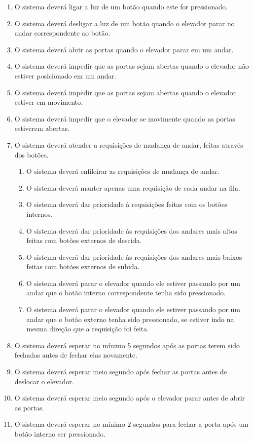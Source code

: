 \begin{enumerate}[label=RF \arabic*. , ref=\arabic*]
	\item O sistema deverá ligar a luz de um botão quando este for pressionado.
  \item O sistema deverá desligar a luz de um botão quando o elevador parar no andar correspondente ao botão.
  \item O sistema deverá abrir as portas quando o elevador parar em um andar.
  \item O sistema deverá impedir que as portas sejam abertas quando o elevador não estiver posicionado em um andar.
  \item O sistema deverá impedir que as portas sejam abertas quando o elevador estiver em movimento.
  \item O sistema deverá impedir que o elevador se movimente quando as portas estiverem abertas.
  \item O sistema deverá atender a requisições de mudança de andar, feitas através dos botões.
  \begin{enumerate}[label*=\arabic*.]
    \item O sistema deverá enfileirar as requisições de mudança de andar.
    \item O sistema deverá manter apenas uma requisição de cada andar na fila.
    \item O sistema deverá dar prioridade à requisições feitas com os botões internos.
    \item O sistema deverá dar prioridade às requisições dos andares mais altos feitas com botões externos de descida.
    \item O sistema deverá dar prioridade às requisições dos andares mais baixos feitas com botões externos de subida.
    \item O sistema deverá parar o elevador quando ele estiver passando por um andar que o botão interno correspondente tenha sido pressionado.
    \item O sistema deverá parar o elevador quando ele estiver passando por um andar que o botão externo tenha sido pressionado, se estiver indo na mesma direção que a requisição foi feita.
    \end{enumerate}
  \item O sistema deverá esperar no mínimo 5 segundos após as portas terem sido fechadas antes de fechar elas novamente.
  \item O sistema deverá esperar meio segundo após fechar as portas antes de deslocar o elevador.
  \item O sistema deverá esperar meio segundo após o elevador parar antes de abrir as portas.
  \item O sistema deverá esperar no mínimo 2 segundos para fechar a porta após um botão interno ser pressionado.
\end{enumerate}


